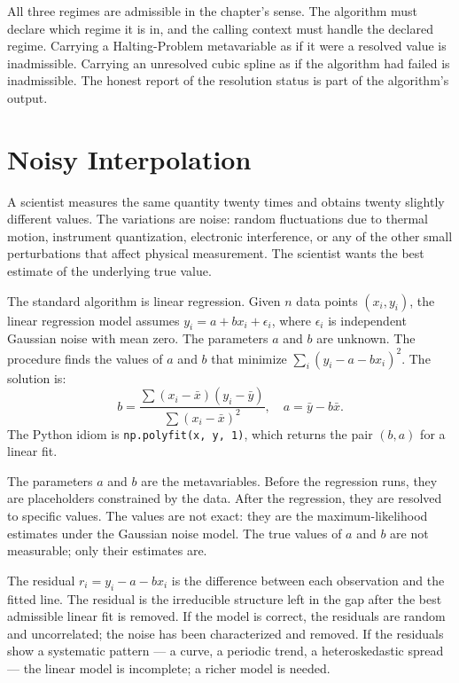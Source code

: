 All three regimes are admissible in the chapter's sense. The
algorithm must declare which regime it is in, and the calling
context must handle the declared regime. Carrying a Halting-Problem
metavariable as if it were a resolved value is inadmissible. Carrying
an unresolved cubic spline as if the algorithm had failed is
inadmissible. The honest report of the resolution status is part of
the algorithm's output.

\section{Noisy Interpolation}
\label{se:noisy-interpolation}

A scientist measures the same quantity twenty times and obtains twenty
slightly different values. The variations are noise: random fluctuations
due to thermal motion, instrument quantization, electronic interference,
or any of the other small perturbations that affect physical measurement.
The scientist wants the best estimate of the underlying true value.

The standard algorithm is linear regression. Given $n$ data points
$(x_i, y_i)$, the linear regression model assumes $y_i = a + b x_i +
\epsilon_i$, where $\epsilon_i$ is independent Gaussian noise with mean
zero. The parameters $a$ and $b$ are unknown. The procedure finds the
values of $a$ and $b$ that minimize $\sum_i (y_i - a - b x_i)^2$. The
solution is:
\[
b = \frac{\sum (x_i - \bar{x})(y_i - \bar{y})}{\sum (x_i - \bar{x})^2},
\quad
a = \bar{y} - b \bar{x}.
\]
The Python idiom is \texttt{np.polyfit(x, y, 1)}, which returns the pair
$(b, a)$ for a linear fit.

The parameters $a$ and $b$ are the metavariables. Before the regression
runs, they are placeholders constrained by the data. After the
regression, they are resolved to specific values. The values are not
exact: they are the maximum-likelihood estimates under the Gaussian noise
model. The true values of $a$ and $b$ are not measurable; only their
estimates are.

The residual $r_i = y_i - a - b x_i$ is the difference between each
observation and the fitted line. The residual is the irreducible
structure left in the gap after the best admissible linear fit is
removed. If the model is correct, the residuals are random and
uncorrelated; the noise has been characterized and removed. If the
residuals show a systematic pattern --- a curve, a periodic trend, a
heteroskedastic spread --- the linear model is incomplete; a richer
model is needed.

